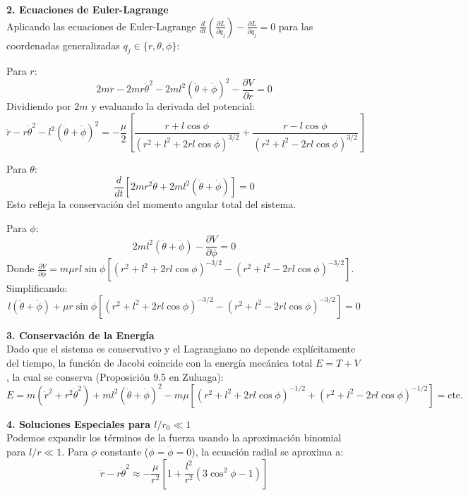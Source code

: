 \documentclass[a4paper]{article}
\begin{document}
\textbf{2. Ecuaciones de Euler-Lagrange} \\
Aplicando las ecuaciones de Euler-Lagrange $\frac{d}{dt}\left(\frac{\partial L}{\partial \dot{q}_j}\right) - \frac{\partial L}{\partial q_j} = 0$ para las coordenadas generalizadas $q_j \in \{r, \theta, \phi\}$:

Para $r$:
$$
2m\ddot{r} - 2mr\dot{\theta}^2 - 2ml^2(\dot{\theta}+\dot{\phi})^2 - \frac{\partial V}{\partial r} = 0
$$
Dividiendo por $2m$ y evaluando la derivada del potencial:
$$
\ddot{r} - r\dot{\theta}^2 - l^2(\dot{\theta}+\dot{\phi})^2 = -\frac{\mu}{2} \left[ \frac{r+l\cos\phi}{(r^2+l^2+2rl\cos\phi)^{3/2}} + \frac{r-l\cos\phi}{(r^2+l^2-2rl\cos\phi)^{3/2}} \right]
$$

Para $\theta$:
$$
\frac{d}{dt} \left[ 2mr^2\dot{\theta} + 2ml^2(\dot{\theta}+\dot{\phi}) \right] = 0
$$
Esto refleja la conservación del momento angular total del sistema.

Para $\phi$:
$$
2ml^2(\ddot{\theta}+\ddot{\phi}) - \frac{\partial V}{\partial \phi} = 0
$$
Donde $\frac{\partial V}{\partial \phi} = m\mu r l \sin\phi \left[ (r^2+l^2+2rl\cos\phi)^{-3/2} - (r^2+l^2-2rl\cos\phi)^{-3/2} \right]$. Simplificando:
$$
l(\ddot{\theta}+\ddot{\phi}) + \mu r \sin\phi \left[ (r^2+l^2+2rl\cos\phi)^{-3/2} - (r^2+l^2-2rl\cos\phi)^{-3/2} \right] = 0
$$

\textbf{3. Conservación de la Energía} \\
Dado que el sistema es conservativo y el Lagrangiano no depende explícitamente del tiempo, la función de Jacobi coincide con la energía mecánica total $E = T + V$, la cual se conserva (Proposición 9.5 en Zuluaga):
$$
E = m(\dot{r}^2 + r^2\dot{\theta}^2) + ml^2(\dot{\theta} + \dot{\phi})^2 - m\mu \left[ (r^2+l^2+2rl\cos\phi)^{-1/2} + (r^2+l^2-2rl\cos\phi)^{-1/2} \right] = \text{cte.}
$$

\textbf{4. Soluciones Especiales para $l/r_0 \ll 1$} \\
Podemos expandir los términos de la fuerza usando la aproximación binomial para $l/r \ll 1$. Para $\phi$ constante ($\dot{\phi}=\ddot{\phi}=0$), la ecuación radial se aproxima a:
$$
\ddot{r} - r\dot{\theta}^2 \approx -\frac{\mu}{r^2} \left[ 1 + \frac{l^2}{r^2}(3\cos^2\phi - 1) \right]
$$
\end{document}
